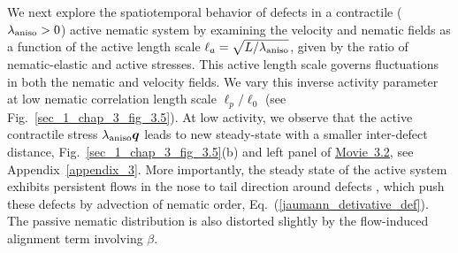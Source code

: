 We next explore the spatiotemporal behavior of defects in a contractile ($\lambda_{\rm aniso} > 0$) active nematic system by examining the  velocity and nematic fields as a function of the active length scale $\ell_a = \sqrt{L/\lambda_{ \rm aniso}}$, given by the ratio of nematic-elastic and active stresses. This active length scale governs fluctuations in both the nematic and velocity fields. We vary this inverse activity parameter at low nematic correlation length scale $\ell_p/\ell_0$ (see Fig.~\ref{sec_1_chap_3_fig_3.5}).  At low activity, we observe that the active contractile stress $\lambda_{\rm aniso} \bm{q}$ leads to new steady-state with a smaller inter-defect distance, Fig.~\ref{sec_1_chap_3_fig_3.5}(b) and left panel of \href{https://github.com/waleedmirzaPhD/movies_thesis.git}{Movie~3.2}, see Appendix~\ref{appendix_3}. More importantly, the steady state of the active system exhibits persistent flows in the nose to tail direction around defects \cite{doostmohammadi2018,ronning2022}, which push these defects by advection of nematic order, Eq.~(\ref{jaumann_detivative_def}). The passive nematic distribution is also distorted slightly by the flow-induced alignment term involving $\beta$.

